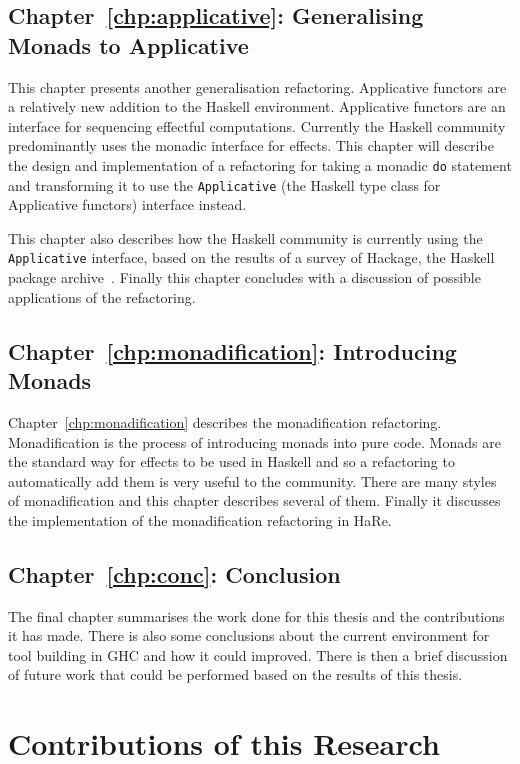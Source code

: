 \subsection*{Chapter~\ref{chp:applicative}: Generalising Monads to Applicative}

This chapter presents another generalisation refactoring. Applicative functors are a relatively new addition to the Haskell environment. Applicative functors are an interface for sequencing effectful computations. Currently the Haskell community predominantly uses the monadic interface for effects. This chapter will describe the design and implementation of a refactoring for taking a monadic \texttt{do} statement and transforming it to use the \texttt{Applicative} (the Haskell type class for Applicative functors) interface instead.

This chapter also describes how the Haskell community is currently using the \texttt{Applicative} interface, based on the results of a survey of Hackage, the Haskell package archive~\citep{hackage}. Finally this chapter concludes with a discussion of possible applications of the refactoring.

\subsection*{Chapter~\ref{chp:monadification}: Introducing Monads} 

Chapter~\ref{chp:monadification} describes the monadification refactoring. Monadification is the process of introducing monads into pure code. Monads are the standard way for effects to be used in Haskell and so a refactoring to automatically add them is very useful to the community. There are many styles of monadification and this chapter describes several of them. Finally it discusses the implementation of the monadification refactoring in HaRe.

\subsection*{Chapter~\ref{chp:conc}: Conclusion}

The final chapter summarises the work done for this thesis and the contributions it has made. There is also some conclusions about the current environment for tool building in GHC and how it could improved. There is then a brief discussion of future work that could be performed based on the results of this thesis.

\section{Contributions of this Research}

